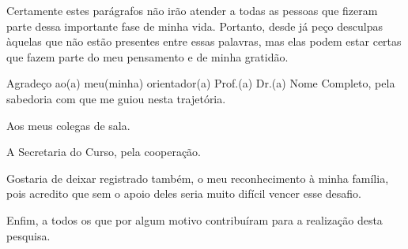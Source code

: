 
\begin{agradecimentos}%

Certamente estes parágrafos não irão atender a todas as pessoas que fizeram parte dessa importante fase de minha vida. Portanto, desde já peço desculpas àquelas que não estão presentes entre essas palavras, mas elas podem estar certas que fazem parte do meu pensamento e de minha gratidão. 

Agradeço ao(a) meu(minha) orientador(a) Prof.(a) Dr.(a) Nome Completo, pela sabedoria com que me guiou nesta trajetória.

Aos meus colegas de sala.

A Secretaria do Curso, pela cooperação.

Gostaria de deixar registrado também, o meu reconhecimento à minha família, pois acredito que sem o apoio deles seria muito difícil vencer esse desafio. 

Enfim, a todos os que por algum motivo contribuíram para a realização desta pesquisa.






\end{agradecimentos}
